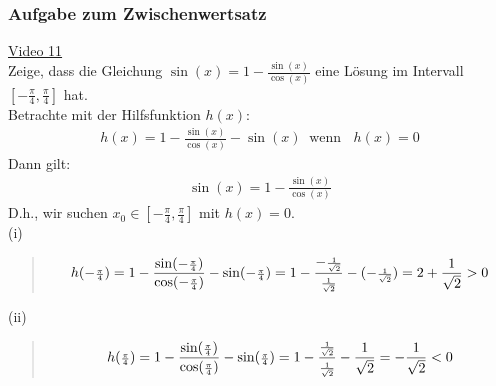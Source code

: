 \subsubsection{Aufgabe zum Zwischenwertsatz}
\href{https://youtu.be/hsNWvy0z_VE}{Video 11}\\
Zeige, dass die Gleichung $ \sin(x)=1-\frac{\sin(x)}{\cos(x)} $ eine Lösung im Intervall $ [-\frac{\pi}{4},\frac{\pi}{4}] $ hat.\vspace*{2mm}\\
Betrachte mit der Hilfsfunktion $ h(x) $:\\
\begin{align*}
h(x)=1-\frac{\sin(x)}{\cos(x)}-\sin(x)\;\;\text{wenn }\;\;h(x)=0
\end{align*}
Dann gilt:
\begin{align*}
\sin(x)=1-\frac{\sin(x)}{\cos(x)}
\end{align*}
D.h., wir suchen $ x_0 \in [-\frac{\pi}{4},\frac{\pi}{4}]$  mit $ h(x) =0.$\\
(i)
\begin{quote}
	
	\begin{align*}
	h(- \genfrac{}{}{}{2}{\pi }{4})=1-\frac{\sin(-\genfrac{}{}{}{2}{\pi}{4 })}{\cos(-\genfrac{}{}{}{2}{\pi }{4 })}-\sin(-\genfrac{}{}{}{2}{\pi }{4 })=1-\frac{-\genfrac{}{}{}{2}{1}{\sqrt{2}}}{\genfrac{}{}{}{2}{1 }{\sqrt{2} }}-(-\genfrac{}{}{}{2}{1 }{\sqrt{2} })=2+\frac{1}{\sqrt{2}}>0
	\end{align*}
\end{quote}
(ii)
\begin{quote}
	
	\begin{align*}
	h( \genfrac{}{}{}{2}{\pi }{4})=1-\frac{\sin(\genfrac{}{}{}{2}{\pi}{4 })}{\cos(\genfrac{}{}{}{2}{\pi }{4 })}-\sin(\genfrac{}{}{}{2}{\pi }{4 })=1-\frac{\genfrac{}{}{}{2}{1}{\sqrt{2}}}{\genfrac{}{}{}{2}{1 }{\sqrt{2} }}-\frac{1}{\sqrt{2}}=-\frac{1}{\sqrt{2}}<0
	\end{align*}
\end{quote}


